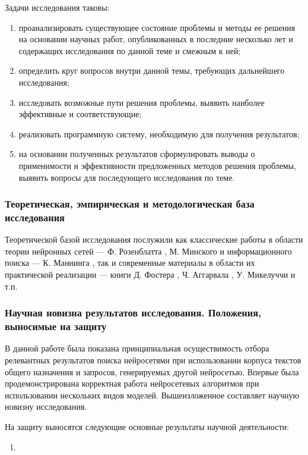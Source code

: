 Задачи исследования таковы:
\begin{enumerate}[1)]
      \item проанализировать существующее состояние проблемы и методы ее решения на основании научных работ, опубликованных
            в последние несколько лет и содержащих исследования по данной теме и смежным к ней;
      \item определить круг вопросов внутри данной темы, требующих дальнейшего исследования;
      \item исследовать возможные пути решения проблемы, выявить наиболее эффективные и соответствующие;
      \item реализовать программную систему, необходимую для получения результатов;
      \item на основании полученных результатов сформулировать выводы о применимости и эффективности предложенных
            методов решения проблемы, выявить вопросы для последующего исследования по теме.
\end{enumerate}

\subsubsection{Теоретическая, эмпирическая и методологическая база исследования}
Теоретической базой исследования послужили как классические работы в области теории нейронных сетей ---
Ф. Розенблатта \cite{rosenblatt1965}, М. Минского \cite{minsky1971} и информационного поиска ---
К. Маннинга \cite{manning2011wwedenie}, так и современные материалы в области
их практической реализации --- книги Д. Фостера \cite{foster2020generative}, Ч. Аггарвала \cite{aggarwal2020neural},
У. Микелуччи \cite{michelucci2020} и т.п.
\subsubsection{Научная новизна результатов исследования. Положения, выносимые на защиту}
В данной работе была показана принципиальная осуществимость отбора релевантных результатов поиска нейросетями при использовании
корпуса текстов общего назначения и запросов, генерируемых другой нейросетью. Впервые была продемонстрирована корректная
работа нейросетевых алгоритмов при использовании нескольких видов моделей.
Вышеизложенное составляет научную новизну исследования.

На защиту выносятся следующие основные результаты научной деятельности:
\begin{enumerate}[1)]
      \item
\end{enumerate}

